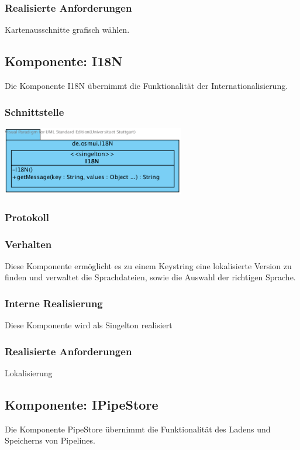 \documentclass[a4paper,12pt]{scrartcl}
\begin{document}
\subsubsection{Realisierte Anforderungen}
Kartenausschnitte grafisch wählen.

\subsection{Komponente: I18N}
Die Komponente I18N übernimmt die Funktionalität der Internationalisierung.
\subsubsection{Schnittstelle}
\begin{center}
\includegraphics[width=8cm]{Schnittstelle_I18N.png}
\end{center}
\subsubsection{Protokoll}
\subsubsection{Verhalten}
Diese Komponente ermöglicht es zu einem Keystring eine lokalisierte Version zu finden und verwaltet die Sprachdateien, sowie die Auswahl der richtigen Sprache.
\subsubsection{Interne Realisierung}
Diese Komponente wird als Singelton realisiert
\subsubsection{Realisierte Anforderungen}
Lokalisierung

\subsection{Komponente: IPipeStore}
Die Komponente PipeStore übernimmt die Funktionalität des Ladens und Speicherns von Pipelines.
\end{document}
